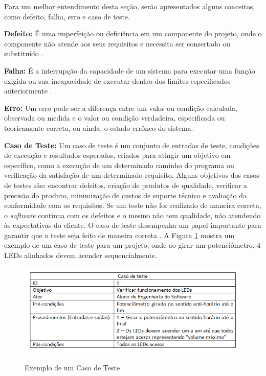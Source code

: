 Para um melhor entendimento desta seção, serão apresentados alguns conceitos, como defeito, falha, erro e caso de teste.

\textbf{Defeito:} É uma imperfeição ou deficiência em um componente do projeto, onde o componente não atende aos seus requisitos e necessita ser consertado ou substituído \cite{PMBOK2013}.

\textbf{Falha:} É a interrupção da capacidade de um sistema para executar uma função exigida ou sua incapacidade de executar dentro dos limites especificados anteriormente \cite{ISOEC15026}.

\textbf{Erro:} Um erro pode ser a diferença entre um valor ou condição calculada, observada ou medida e o valor ou condição verdadeira, especificada ou teoricamente correta, ou ainda, o estado errôneo do sistema. \cite{ISOEC15026}

\textbf{Caso de Teste:} Um caso de teste é um conjunto de entradas de teste, condições de execução e resultados esperados, criados para atingir um objetivo em específico, como a execução de um determinado caminho do programa ou verificação da satisfação de um determinado requisito. Alguns objetivos dos casos de testes são: encontrar defeitos, criação de produtos de qualidade, verificar a precisão do produto, minimização de custos de suporte técnico e avaliação da conformidade com os requisitos. Se um teste não for realizado de maneira correta, o \textit{software} continua com os defeitos e o mesmo não tem qualidade, não atendendo às expectativas do cliente. O caso de teste desempenha um papel importante para garantir que o teste seja feito de maneira correta \cite{ieeeTestCase2014}. A Figura \ref{fig:figura-exemplo-caso-de-teste} mostra um exemplo de um caso de teste para um projeto, onde ao girar um potenciômetro, 4 LEDs alinhados devem acender sequencialmente.

\begin{figure}[!htb]
    \centering
    \caption{Exemplo de um Caso de Teste}
    \includegraphics[width=1\textwidth]{./dados/figuras/casoDeTeste}
    \label{fig:figura-exemplo-caso-de-teste}
\end{figure}

